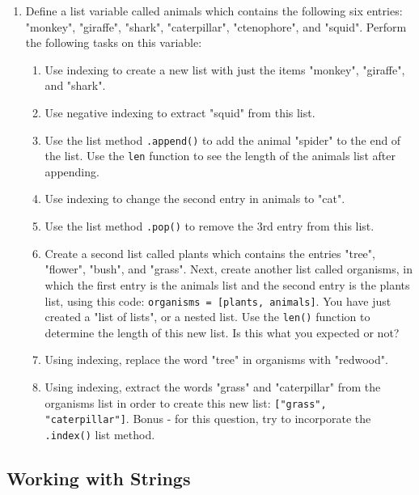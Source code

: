 \documentclass{article}[12pt]
\newcommand{\code}[1]{\texttt{#1}}  %
\begin{document}
\begin{enumerate}[itemsep=5ex]
	
	\item Define a list variable called animals which contains the following six entries: "monkey", "giraffe", "shark", "caterpillar", "ctenophore", and "squid". Perform the following tasks on this variable:
	\begin{enumerate}[itemsep=2ex]
		
		\item Use indexing to create a new list with just the items "monkey", "giraffe", and "shark".
		\item Use negative indexing to extract "squid" from this list.
		\item Use the list method \code{.append()} to add the animal "spider" to the end of the list. Use the \code{len} function to see the length of the animals list after appending.
		\item Use indexing to change the second entry in animals to "cat".
		\item Use the list method \code{.pop()} to remove the 3rd entry from this list. 
		\item Create a second list called plants which contains the entries "tree", "flower", "bush", and "grass". Next, create another list called organisms, in which the first entry is the animals list and the second entry is the plants list, using this code: \code{organisms = [plants, animals]}. You have just created a "list of lists", or a nested list. Use the \code{len()} function to determine the length of this new list. Is this what you expected or not?
		\item Using indexing, replace the word "tree" in organisms with "redwood". 
		\item Using indexing, extract the words "grass" and "caterpillar" from the organisms list in order to create this new list: \code{["grass", "caterpillar"]}. Bonus - for this question, try to incorporate the \code{.index()} list method.
	\end{enumerate}

	
	
\end{enumerate}

\vspace{1.5cm}

\subsection{Working with Strings}
\end{document}
